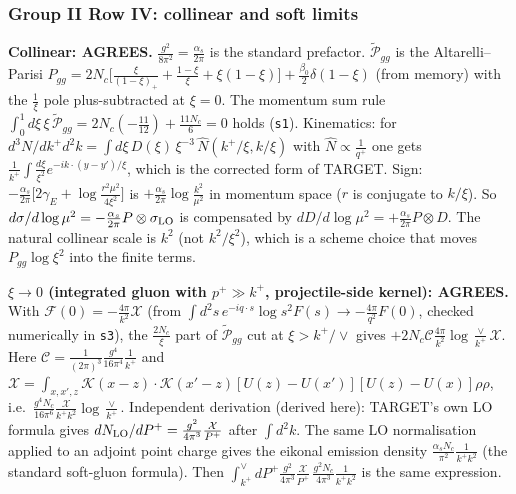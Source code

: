 \subsubsection{Group II Row IV: collinear and soft limits}
\textbf{Collinear: AGREES.} $\frac{g^{2}}{8\pi^{2}}=\frac{\alpha_{s}}{2\pi}$ is the standard prefactor. $\widetilde{\mathcal P}_{gg}$ is the Altarelli--Parisi $P_{gg}=2N_{c}\big[\frac{\xi}{(1-\xi)_{+}}+\frac{1-\xi}{\xi}+\xi(1-\xi)\big]+\frac{\beta_{0}}{2}\delta(1-\xi)$ (from memory) with the $\frac1\xi$ pole plus-subtracted at $\xi=0$. The momentum sum rule $\int_{0}^{1}d\xi\,\xi\,\widetilde{\mathcal P}_{gg}=2N_{c}(-\frac{11}{12})+\frac{11N_{c}}{6}=0$ holds (\texttt{s1}). Kinematics: for $d^{3}N/dk^{+}d^{2}k=\int d\xi\,D(\xi)\,\xi^{-3}\,\hat N(k^{+}/\xi,k/\xi)$ with $\hat N\propto\frac{1}{q^{+}}$ one gets $\frac{1}{k^{+}}\int\frac{d\xi}{\xi^{2}}e^{-ik\cdot(y-y')/\xi}$, which is the corrected form of TARGET. Sign: $-\frac{\alpha_{s}}{2\pi}\big[2\gamma_{E}+\log\frac{r^{2}\mu^{2}}{4\xi^{2}}\big]$ is $+\frac{\alpha_{s}}{2\pi}\log\frac{k^{2}}{\mu^{2}}$ in momentum space ($r$ is conjugate to $k/\xi$). So $d\sigma/d\log\mu^{2}=-\frac{\alpha_{s}}{2\pi}P\otimes\sigma_{\rm LO}$ is compensated by $dD/d\log\mu^{2}=+\frac{\alpha_{s}}{2\pi}P\otimes D$. The natural collinear scale is $k^{2}$ (not $k^{2}/\xi^{2}$), which is a scheme choice that moves $P_{gg}\log\xi^{2}$ into the finite terms.

\noindent\textbf{$\xi\to0$ (integrated gluon with $p^{+}\gg k^{+}$, projectile-side kernel): AGREES.} With $\mathcal F(0)=-\frac{4\pi}{k^{2}}\mathcal X$ (from $\int d^{2}s\,e^{-iq\cdot s}\log s^{2}F(s)\to-\frac{4\pi}{q^{2}}F(0)$, checked numerically in \texttt{s3}), the $\frac{2N_{c}}{\xi}$ part of $\widetilde{\mathcal P}_{gg}$ cut at $\xi>k^{+}/\vee$ gives $+2N_{c}\mathcal C\frac{4\pi}{k^{2}}\log\frac{\vee}{k^{+}}\mathcal X$. Here $\mathcal C=\frac{1}{(2\pi)^{3}}\frac{g^{4}}{16\pi^{4}}\frac{1}{k^{+}}$ and $\mathcal X=\int_{x,x',z}\mathcal K(x-z)\cdot\mathcal K(x'-z)[U(z)-U(x')][U(z)-U(x)]\rho\rho$, i.e.\ $\frac{g^{4}N_{c}}{16\pi^{6}}\frac{\mathcal X}{k^{+}k^{2}}\log\frac{\vee}{k^{+}}$. Independent derivation (derived here): TARGET's own LO formula gives $dN_{\rm LO}/dP^{+}=\frac{g^{2}}{4\pi^{3}}\frac{\mathcal X}{P^{+}}$ after $\int d^{2}k$. The same LO normalisation applied to an adjoint point charge gives the eikonal emission density $\frac{\alpha_{s}N_{c}}{\pi^{2}}\frac{1}{k^{+}k^{2}}$ (the standard soft-gluon formula). Then $\int_{k^{+}}^{\vee}dP^{+}\frac{g^{2}}{4\pi^{3}}\frac{\mathcal X}{P^{+}}\,\frac{g^{2}N_{c}}{4\pi^{3}}\frac{1}{k^{+}k^{2}}$ is the same expression.

